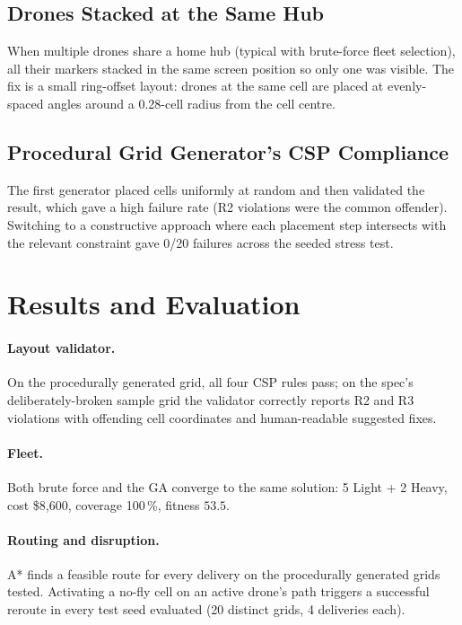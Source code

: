 \documentclass[11pt,a4paper]{article}
\begin{document}
\subsection{Drones Stacked at the Same Hub}
When multiple drones share a home hub (typical with brute-force fleet
selection), all their markers stacked in the same screen position so
only one was visible. The fix is a small ring-offset layout: drones at
the same cell are placed at evenly-spaced angles around a 0.28-cell
radius from the cell centre.

\subsection{Procedural Grid Generator's CSP Compliance}
The first generator placed cells uniformly at random and then validated
the result, which gave a high failure rate (R2 violations were the
common offender). Switching to a constructive approach where each
placement step intersects with the relevant constraint gave 0/20
failures across the seeded stress test.

\section{Results and Evaluation}
\label{sec:results}

\paragraph{Layout validator.} On the procedurally generated grid, all
four CSP rules pass; on the spec's deliberately-broken sample grid the
validator correctly reports R2 and R3 violations with offending cell
coordinates and human-readable suggested fixes.

\paragraph{Fleet.} Both brute force and the GA converge to the same
solution: 5 Light + 2 Heavy, cost \$8{,}600, coverage 100\,\%, fitness
$53.5$.

\paragraph{Routing and disruption.} A* finds a feasible route for every
delivery on the procedurally generated grids tested. Activating a no-fly
cell on an active drone's path triggers a successful reroute in every
test seed evaluated (20 distinct grids, 4 deliveries each).
\end{document}
